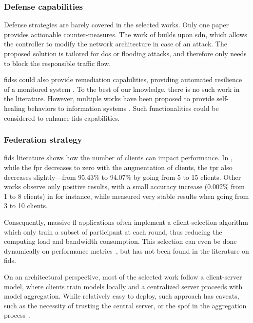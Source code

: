 

\subsubsection{Defense capabilities}
\label{sec:sota.quali.defense}

Defense strategies are barely covered in the selected works.
Only one paper provides actionable counter-measures.
The work of \textcite{rathore_BlockSecIoTNetBlockchainbaseddecentralized_2019} builds upon \gls{sdn}, which allows the controller to modify the network architecture in case of an attack.
The proposed solution is tailored for \gls{dos} or flooding attacks, and therefore only needs to block the responsible traffic flow.

\Glspl{fids} could also provide remediation capabilities, providing automated resilience of a monitored system \cite{Ghosh2007}.
To the best of our knowledge, there is no such work in the literature.
However, multiple works have been proposed to provide self-healing behaviors to information systems \cite{Elsadig2010,Ali-Tolppa2018}.
Such functionalities could be considered to enhance \gls{fids} capabilities.


\subsubsection{Federation strategy}
\label{sec:sota.quali.fed}

\Gls{fids} literature shows how the number of clients can impact performance.
In \cite{nguyen_DIoTFederatedSelflearning_2019}, while the \gls{fpr} decreases to zero with the augmentation of clients, the \gls{tpr} also decreases slightly---from 95.43\% to 94.07\% by going from 5 to 15 clients. Other works observe only positive results, with a small accuracy increase (0.002\% from 1 to 8 clients) in \cite{schneble_Attackdetectionusing_2019} for instance, while \textcite{li_DeepFedFederatedDeep_2020} measured very stable results when going from 3 to 10 clients.

Consequently, massive \gls{fl} applications often implement a client-selection algorithm which only train a subset of participant at each round, thus reducing the computing load and bandwidth consumption.
This selection can even be done dynamically on performance metrics~\cite{Zhang2020}, but has not been found in the literature on \gls{fids}.

On an architectural perspective, most of the selected work follow a client-server model, where clients train models locally and a centralized server proceeds with model aggregation.
While relatively easy to deploy, such approach has caveats, such as the necessity of trusting the central server, or the \gls{spof} in the aggregation process~\cite{Aledhari2020}.

